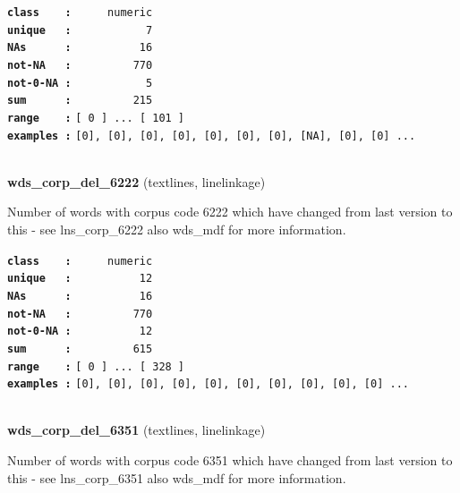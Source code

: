 \documentclass[]{article}
\begin{document}
\textbf{\texttt{class\ \ \ \ :}} \texttt{~~~~~numeric}\\
\textbf{\texttt{unique\ \ \ :}} \texttt{~~~~~~~~~~~7}\\
\textbf{\texttt{NAs\ \ \ \ \ \ :}} \texttt{~~~~~~~~~~16}\\
\textbf{\texttt{not-NA\ \ \ :}} \texttt{~~~~~~~~~770}\\
\textbf{\texttt{not-0-NA\ :}} \texttt{~~~~~~~~~~~5}\\
\textbf{\texttt{sum\ \ \ \ \ \ :}} \texttt{~~~~~~~~~215}\\
\textbf{\texttt{range\ \ \ \ :}}
\texttt{{[}\ 0\ {]}\ ...\ {[}\ 101\ {]}}\\
\textbf{\texttt{examples\ :}}
\texttt{{[}0{]},\ {[}0{]},\ {[}0{]},\ {[}0{]},\ {[}0{]},\ {[}0{]},\ {[}0{]},\ {[}NA{]},\ {[}0{]},\ {[}0{]}\ ...}\\

~

\textbf{wds\_corp\_del\_6222} (textlines, linelinkage)

Number of words with corpus code 6222 which have changed from last
version to this - see lns\_corp\_6222 also wds\_mdf for more
information.

\textbf{\texttt{class\ \ \ \ :}} \texttt{~~~~~numeric}\\
\textbf{\texttt{unique\ \ \ :}} \texttt{~~~~~~~~~~12}\\
\textbf{\texttt{NAs\ \ \ \ \ \ :}} \texttt{~~~~~~~~~~16}\\
\textbf{\texttt{not-NA\ \ \ :}} \texttt{~~~~~~~~~770}\\
\textbf{\texttt{not-0-NA\ :}} \texttt{~~~~~~~~~~12}\\
\textbf{\texttt{sum\ \ \ \ \ \ :}} \texttt{~~~~~~~~~615}\\
\textbf{\texttt{range\ \ \ \ :}}
\texttt{{[}\ 0\ {]}\ ...\ {[}\ 328\ {]}}\\
\textbf{\texttt{examples\ :}}
\texttt{{[}0{]},\ {[}0{]},\ {[}0{]},\ {[}0{]},\ {[}0{]},\ {[}0{]},\ {[}0{]},\ {[}0{]},\ {[}0{]},\ {[}0{]}\ ...}\\

~

\textbf{wds\_corp\_del\_6351} (textlines, linelinkage)

Number of words with corpus code 6351 which have changed from last
version to this - see lns\_corp\_6351 also wds\_mdf for more
information.
\end{document}
